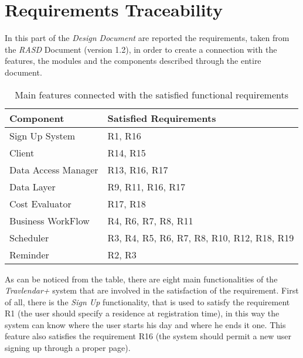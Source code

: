 \chapter{Requirements Traceability}
In this part of the \emph{Design Document} are reported the requirements, taken from the \emph{RASD} Document (version 1.2), in order to create a connection with the features, the modules and the components described through the entire document.

\renewcommand{\arraystretch}{1.5}

\begin{table}[H]
    \centering
    \begin{tabular}{p{4cm} | p{7cm}}
        \large{\textbf{Component}} & \large{\textbf{Satisfied Requirements}} \\
        \hline
        
        Sign Up System              & R1, R16                                   \\
        
        Client                      & R14, R15                                  \\
        
        Data Access Manager         & R13, R16, R17                                  \\
        
        Data Layer                  & R9, R11, R16, R17                         \\
        
        Cost Evaluator              & R17, R18                             \\
        
        Business WorkFlow           & R4, R6, R7, R8, R11                       \\
        
        Scheduler                   & R3, R4, R5, R6, R7, R8, R10, R12, R18, R19     \\
        
        Reminder                    & R2, R3                                    \\
    \end{tabular}
    \caption{Main features connected with the satisfied functional requirements}
\end{table}

As can be noticed from the table, there are eight main functionalities of the \emph{Travlendar+} system that are involved in the satisfaction of the requirement. 
First of all, there is the \emph{Sign Up} functionality, that is used to satisfy the requirement R1 (the user should specify a residence at registration time), in this way the system can know where the user starts his day and where he ends it one. This feature also satisfies the requirement R16 (the system should permit a new user signing up through a proper page).

